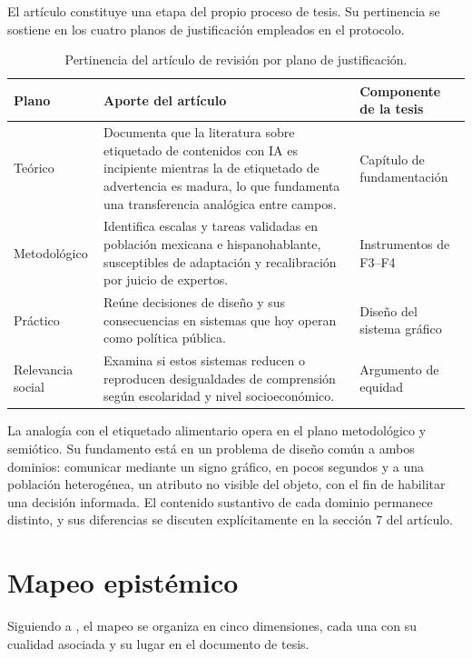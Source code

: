 \documentclass[letter,12pt]{article}
\begin{document}
El artículo constituye una etapa del propio proceso de tesis. Su pertinencia se sostiene en los cuatro planos de justificación empleados en el protocolo.

\begin{table}[H]
\centering
\footnotesize
\caption{Pertinencia del artículo de revisión por plano de justificación.}
\label{tab:pertinencia}
\renewcommand{\arraystretch}{1.35}
\begin{tabular}{|p{2.2cm}|p{6.3cm}|p{3.6cm}|}
\hline
\rowcolor{bgCotejo}
\textbf{Plano} & \textbf{Aporte del artículo} & \textbf{Componente de la tesis} \\
\hline
Teórico & Documenta que la literatura sobre etiquetado de contenidos con IA es incipiente mientras la de etiquetado de advertencia es madura, lo que fundamenta una transferencia analógica entre campos. & Capítulo de fundamentación \\
\hline
Metodológico & Identifica escalas y tareas validadas en población mexicana e hispanohablante, susceptibles de adaptación y recalibración por juicio de expertos. & Instrumentos de F3--F4 \\
\hline
Práctico & Reúne decisiones de diseño y sus consecuencias en sistemas que hoy operan como política pública. & Diseño del sistema gráfico \\
\hline
Relevancia social & Examina si estos sistemas reducen o reproducen desigualdades de comprensión según escolaridad y nivel socioeconómico. & Argumento de equidad \\
\hline
\end{tabular}
\end{table}

La analogía con el etiquetado alimentario opera en el plano metodológico y semiótico. Su fundamento está en un problema de diseño común a ambos dominios: comunicar mediante un signo gráfico, en pocos segundos y a una población heterogénea, un atributo no visible del objeto, con el fin de habilitar una decisión informada. El contenido sustantivo de cada dominio permanece distinto, y sus diferencias se discuten explícitamente en la sección 7 del artículo.

\section{Mapeo epistémico}\label{sec:mapeo-epistemico}

Siguiendo a \citet{deroncele2021}, el mapeo se organiza en cinco dimensiones, cada una con su cualidad asociada y su lugar en el documento de tesis.
\end{document}
